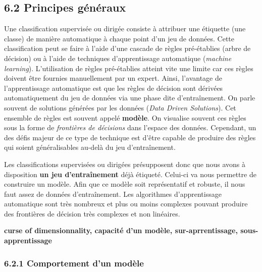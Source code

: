 \documentclass[
]{article}
\begin{document}
\subsection{\texorpdfstring{{6.2} Principes
généraux}{6.2 Principes généraux}}\label{principes-guxe9nuxe9raux}

Une classification supervisée ou dirigée consiste à attribuer une
étiquette (une classe) de manière automatique à chaque point d'un jeu de
données. Cette classification peut se faire à l'aide d'une cascade de
règles pré-établies (arbre de décision) ou à l'aide de techniques
d'apprentissage automatique (\emph{machine learning}). L'utilisation de
règles pré-établies atteint vite une limite car ces règles doivent être
fournies manuellement par un expert. Ainsi, l'avantage de
l'apprentissage automatique est que les règles de décision sont dérivées
automatiquement du jeu de données via une phase dite d'entraînement. On
parle souvent de solutions générées par les données (\emph{Data Driven
Solutions}). Cet ensemble de règles est souvent appelé \textbf{modèle}.
On visualise souvent ces règles sous la forme de \emph{frontières de
décisions} dans l'espace des données. Cependant, un des défis majeur de
ce type de technique est d'être capable de produire des règles qui
soient généralisables au-delà du jeu d'entraînement.

Les classifications supervisées ou dirigées présupposent donc que nous
avons à disposition \textbf{un jeu d'entraînement} déjà étiqueté.
Celui-ci va nous permettre de construire un modèle. Afin que ce modèle
soit représentatif et robuste, il nous faut assez de données
d'entraînement. Les algorithmes d'apprentissage automatique sont très
nombreux et plus ou moins complexes pouvant produire des frontières de
décision très complexes et non linéaires.

\textbf{curse of dimensionnality, capacité d'un modèle,
sur-aprrentissage, sous-apprentissage}

\subsubsection{\texorpdfstring{{6.2.1} Comportement d'un
modèle}{6.2.1 Comportement d'un modèle}}\label{comportement-dun-moduxe8le}
\end{document}
